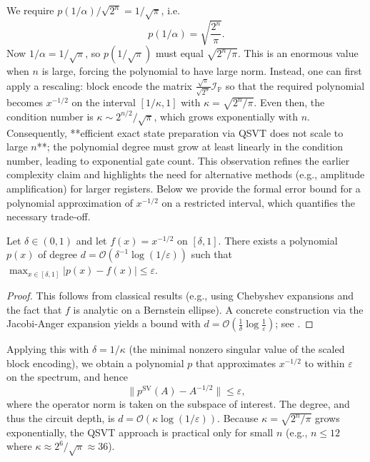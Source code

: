 \documentclass[12pt,a4paper]{article}
\begin{document}
We require \(p(1/\alpha) / \sqrt{2^n} = 1/\sqrt{\pi}\), i.e.
\[
p(1/\alpha) = \sqrt{\frac{2^n}{\pi}}.
\]
Now \(1/\alpha = 1/\sqrt{\pi}\), so \(p(1/\sqrt{\pi})\) must equal \(\sqrt{2^n/\pi}\).  This is an enormous value when \(n\) is large, forcing the polynomial to have large norm.  Instead, one can first apply a rescaling: block encode the matrix \(\frac{\sqrt{\pi}}{\sqrt{2^n}} \mathcal{I}_{\mathbb{P}}\) so that the required polynomial becomes \(x^{-1/2}\) on the interval \([1/\kappa, 1]\) with \(\kappa = \sqrt{2^n/\pi}\).  Even then, the condition number is \(\kappa \sim 2^{n/2}/\sqrt{\pi}\), which grows exponentially with \(n\).  Consequently, **efficient exact state preparation via QSVT does not scale to large \(n\)**; the polynomial degree must grow at least linearly in the condition number, leading to exponential gate count.  This observation refines the earlier complexity claim and highlights the need for alternative methods (e.g., amplitude amplification) for larger registers.  Below we provide the formal error bound for a polynomial approximation of \(x^{-1/2}\) on a restricted interval, which quantifies the necessary trade‑off.

\begin{theorem}\label{thm:invsqrt}
Let \(\delta \in (0,1)\) and let \(f(x) = x^{-1/2}\) on \([\delta, 1]\).  There exists a polynomial \(p(x)\) of degree \(d = \mathcal{O}(\delta^{-1}\log(1/\varepsilon))\) such that \(\max_{x\in[\delta,1]} |p(x) - f(x)| \le \varepsilon\).
\end{theorem}
\begin{proof}
This follows from classical results (e.g., using Chebyshev expansions and the fact that \(f\) is analytic on a Bernstein ellipse).  A concrete construction via the Jacobi‑Anger expansion yields a bound with \(d = \mathcal{O}(\frac{1}{\delta}\log\frac{1}{\varepsilon})\); see \cite{gilyen2019}.
\end{proof}

Applying this with \(\delta = 1/\kappa\) (the minimal nonzero singular value of the scaled block encoding), we obtain a polynomial \(p\) that approximates \(x^{-1/2}\) to within \(\varepsilon\) on the spectrum, and hence
\[
\bigl\| p^{\text{SV}}(A) - A^{-1/2} \bigr\| \le \varepsilon,
\]
where the operator norm is taken on the subspace of interest.  The degree, and thus the circuit depth, is \(d = \mathcal{O}(\kappa \log(1/\varepsilon))\).  Because \(\kappa = \sqrt{2^n/\pi}\) grows exponentially, the QSVT approach is practical only for small \(n\) (e.g., \(n\le 12\) where \(\kappa \approx 2^6/\sqrt{\pi}\approx 36\)).
\end{document}
